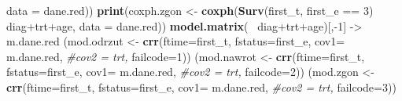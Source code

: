 \documentclass[]{article}
\newenvironment{Shaded}{}{}
\newcommand{\KeywordTok}[1]{\textcolor[rgb]{0.00,0.44,0.13}{\textbf{{#1}}}}
\newcommand{\DataTypeTok}[1]{\textcolor[rgb]{0.56,0.13,0.00}{{#1}}}
\newcommand{\DecValTok}[1]{\textcolor[rgb]{0.25,0.63,0.44}{{#1}}}
\newcommand{\StringTok}[1]{\textcolor[rgb]{0.25,0.44,0.63}{{#1}}}
\newcommand{\CommentTok}[1]{\textcolor[rgb]{0.38,0.63,0.69}{\textit{{#1}}}}
\newcommand{\NormalTok}[1]{{#1}}
\begin{document}
\begin{Shaded}
\begin{Highlighting}[]
                          \DataTypeTok{data =} \NormalTok{dane.red))}
\KeywordTok{print}\NormalTok{(coxph.zgon <-}\StringTok{ }
\StringTok{          }\KeywordTok{coxph}\NormalTok{(}\KeywordTok{Surv}\NormalTok{(first_t, first_e ==}\StringTok{ }\DecValTok{3}\NormalTok{) ~}\StringTok{ }\NormalTok{diag+trt+age,}
                          \DataTypeTok{data =} \NormalTok{dane.red))}
\KeywordTok{model.matrix}\NormalTok{(~}\StringTok{ }\NormalTok{diag+trt+age)[,-}\DecValTok{1}\NormalTok{] ->}\StringTok{ }\NormalTok{m.dane.red}
\NormalTok{(mod.odrzut <-}\StringTok{ }\KeywordTok{crr}\NormalTok{(}\DataTypeTok{ftime=}\NormalTok{first_t, }\DataTypeTok{fstatus=}\NormalTok{first_e,}
                        \DataTypeTok{cov1=} \NormalTok{m.dane.red,}
                        \CommentTok{#cov2 = trt,}
                        \DataTypeTok{failcode=}\DecValTok{1}\NormalTok{))}
\NormalTok{(mod.nawrot <-}\StringTok{ }\KeywordTok{crr}\NormalTok{(}\DataTypeTok{ftime=}\NormalTok{first_t, }\DataTypeTok{fstatus=}\NormalTok{first_e,}
                          \DataTypeTok{cov1=} \NormalTok{m.dane.red,}
                          \CommentTok{#cov2 = trt,}
                          \DataTypeTok{failcode=}\DecValTok{2}\NormalTok{))}
\NormalTok{(mod.zgon <-}\StringTok{ }\KeywordTok{crr}\NormalTok{(}\DataTypeTok{ftime=}\NormalTok{first_t, }\DataTypeTok{fstatus=}\NormalTok{first_e,}
                          \DataTypeTok{cov1=} \NormalTok{m.dane.red,}
                          \CommentTok{#cov2 = trt,}
                          \DataTypeTok{failcode=}\DecValTok{3}\NormalTok{))}
\end{Highlighting}
\end{Shaded}
\end{document}
